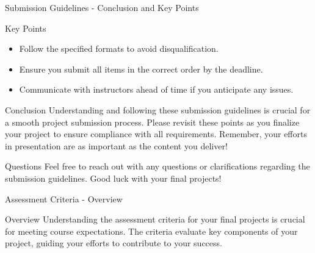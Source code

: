 \documentclass[aspectratio=169]{beamer}
\begin{document}
\begin{frame}[fragile]{Submission Guidelines - Conclusion and Key Points}
  \begin{block}{Key Points}
    \begin{itemize}
      \item Follow the specified formats to avoid disqualification.
      \item Ensure you submit all items in the correct order by the deadline.
      \item Communicate with instructors ahead of time if you anticipate any issues.
    \end{itemize}
  \end{block}
  
  \begin{block}{Conclusion}
    Understanding and following these submission guidelines is crucial for a smooth project submission process. Please revisit these points as you finalize your project to ensure compliance with all requirements. Remember, your efforts in presentation are as important as the content you deliver!
  \end{block}
  
  \begin{block}{Questions}
    Feel free to reach out with any questions or clarifications regarding the submission guidelines. Good luck with your final projects!
  \end{block}
\end{frame}

\begin{frame}[fragile]{Assessment Criteria - Overview}
    \begin{block}{Overview}
        Understanding the assessment criteria for your final projects is crucial for meeting course expectations. The criteria evaluate key components of your project, guiding your efforts to contribute to your success.
    \end{block}
\end{frame}
\end{document}
